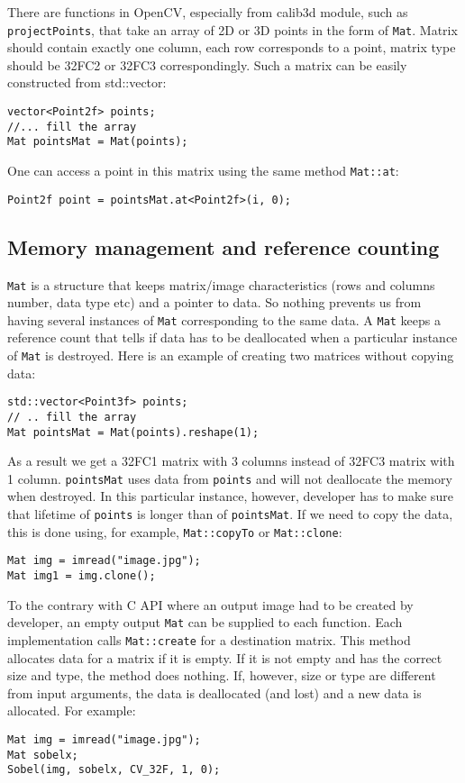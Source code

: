 There are functions in OpenCV, especially from calib3d module, such as \texttt{projectPoints}, that take an array of 2D or 3D points in the form of \texttt{Mat}. Matrix should contain exactly one column, each row corresponds to a point, matrix type should be 32FC2 or 32FC3 correspondingly. Such a matrix can be easily constructed from std::vector:
\begin{lstlisting}
vector<Point2f> points;
//... fill the array
Mat pointsMat = Mat(points);
\end{lstlisting}
One can access a point in this matrix using the same method \texttt{Mat::at}:
\begin{lstlisting}
Point2f point = pointsMat.at<Point2f>(i, 0);
\end{lstlisting}

\subsection{Memory management and reference counting}
\texttt{Mat} is a structure that keeps matrix/image characteristics (rows and columns number, data type etc) and a pointer to data. So nothing prevents us from having several instances of \texttt{Mat} corresponding to the same data. A \texttt{Mat} keeps a reference count that tells if data has to be deallocated when a particular instance of \texttt{Mat} is destroyed. Here is an example of creating two matrices without copying data:
\begin{lstlisting}
std::vector<Point3f> points;
// .. fill the array
Mat pointsMat = Mat(points).reshape(1);
\end{lstlisting}
As a result we get a 32FC1 matrix with 3 columns instead of 32FC3 matrix with 1 column. \texttt{pointsMat} uses data from \texttt{points} and will not deallocate the memory when destroyed. In this particular instance, however, developer has to make sure that lifetime of \texttt{points} is longer than of \texttt{pointsMat}. 
If we need to copy the data, this is done using, for example, \texttt{Mat::copyTo} or \texttt{Mat::clone}:
\begin{lstlisting}
Mat img = imread("image.jpg");
Mat img1 = img.clone();
\end{lstlisting}
To the contrary with C API where an output image had to be created by developer, an empty output \texttt{Mat} can be supplied to each function. Each implementation calls \texttt{Mat::create} for a destination matrix. This method allocates data for a matrix if it is empty. If it is not empty and has the correct size and type, the method does nothing. If, however, size or type are different from input arguments, the data is deallocated (and lost) and a new data is allocated. For example:
\begin{lstlisting}
Mat img = imread("image.jpg");
Mat sobelx;
Sobel(img, sobelx, CV_32F, 1, 0);
\end{lstlisting}

